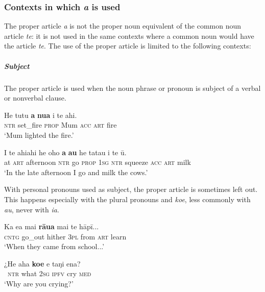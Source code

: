\subsubsection[Contexts in which a is used]{Contexts in which \textit{a} is used}\label{sec:5.13.2.1}

The proper article \textit{a} is not the proper noun equivalent of the common noun article \textit{te}: it is not used in the same contexts where a common noun would have the article \textit{te}. The use of the proper article is limited to the following contexts:

\subparagraph{Subject} The proper article is used when the noun phrase or pronoun is subject of a verbal or nonverbal clause.

\ea\label{ex:5.186}
\gll He tutu \textbf{a} \textbf{nua} i te ahi. \\
\textsc{ntr} set\_fire \textsc{prop} Mum \textsc{acc} \textsc{art} fire \\

\glt 
‘Mum lighted the fire.’ \textstyleExampleref{[R232.047]} 
\z

\ea\label{ex:5.187}
\gll {\ꞌ}I te ahiahi he oho \textbf{a} \textbf{au} he tatau i te ū.\\
at \textsc{art} afternoon \textsc{ntr} go \textsc{prop} \textsc{1sg} \textsc{ntr} squeeze \textsc{acc} \textsc{art} milk\\

\glt
‘In the late afternoon I go and milk the cows.’ \textstyleExampleref{[R334.277]} 
\z

With personal pronouns used as subject, the proper article is sometimes left out. This happens especially with the plural pronouns and \textit{koe}, less commonly with \textit{au}, never with \textit{ia}. 

\ea\label{ex:5.188}
\gll Ka e{\ꞌ}a mai \textbf{rāua} mai te hāpī... \\
\textsc{cntg} go\_out hither \textsc{3pl} from \textsc{art} learn \\

\glt 
‘When they came from school...’ \textstyleExampleref{[R381.012]} 
\z

\ea\label{ex:5.189}
\gll ¿He aha \textbf{koe} e taŋi ena? \\
~\textsc{ntr} what \textsc{2sg} \textsc{ipfv} cry \textsc{med} \\

\glt 
‘Why are you crying?’ \textstyleExampleref{[R229.185]} 
\z

